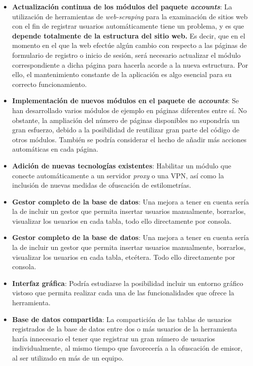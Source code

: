 \begin{itemize}
	\item \textbf{Actualización continua de los módulos del paquete \textit{accounts}}: La utilización de herramientas de \textit{web-scraping} para la examinación de sitios web con el fin de registrar usuarios automáticamente tiene un problema, y es que \textbf{depende totalmente de la estructura del sitio web.} Es decir, que en el momento en el que la web efectúe algún cambio con respecto a las páginas de formulario de registro o inicio de sesión, será necesario actualizar el módulo correspondiente a dicha página para hacerla acorde a la nueva estructura. Por ello, el mantenimiento constante de la aplicación es algo esencial para su correcto funcionamiento.
	\item \textbf{Implementación de nuevos módulos en el paquete de \textit{accounts}}: Se han desarrollado varios módulos de ejemplo en páginas diferentes entre sí. No obstante, la ampliación del número de páginas disponibles no supondría un gran esfuerzo, debido a la posibilidad de reutilizar gran parte del código de otros módulos. También se podría considerar el hecho de añadir más acciones automáticas en cada página.
	\item \textbf{Adición de nuevas tecnologías existentes}: Habilitar un módulo que conecte automáticamente a un servidor \textit{proxy} o una VPN, así como la inclusión de nuevas medidas de ofuscación de estilometrías.
	\item \textbf{Gestor completo de la base de datos}: Una mejora a tener en cuenta sería la de incluir un gestor que permita insertar usuarios manualmente, borrarlos, visualizar los usuarios en cada tabla, todo ello directamente por consola.
	\item \textbf{Gestor completo de la base de datos}: Una mejora a tener en cuenta sería la de incluir un gestor que permita insertar usuarios manualmente, borrarlos, visualizar los usuarios en cada tabla, etcétera. Todo ello directamente por consola.	
	\item \textbf{Interfaz gráfica}: Podría estudiarse la posibilidad incluir un entorno gráfico vistoso que permita realizar cada una de las funcionalidades que ofrece la herramienta.
	\item \textbf{Base de datos compartida}: La compartición de las tablas de usuarios registrados de la base de datos entre dos o más usuarios de la herramienta haría innecesario el tener que registrar un gran número de usuarios individualmente, al mismo tiempo que favorecería a la ofuscación de emisor, al ser utilizado en más de un equipo.

\end{itemize}
